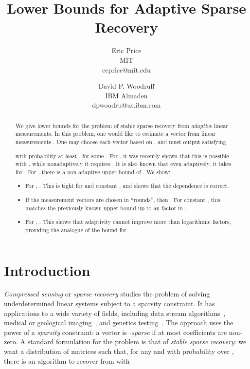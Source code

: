 \documentclass[twoside,leqno,twocolumn]{article}
\begin{document}
\title{Lower Bounds for Adaptive Sparse Recovery}

\author{Eric Price\\MIT\\ecprice@mit.edu \and David P. Woodruff\\IBM Almaden\\dpwoodru@us.ibm.com}
\date{}
\maketitle
\thispagestyle{empty}
\setcounter{page}{0}

\begin{abstract}
  We give lower bounds for the problem of stable sparse recovery from
  \emph{adaptive} linear measurements.  In this problem, one would
  like to estimate a vector  from  linear measurements
  .  One may choose each vector  based on
  , and must output  satisfying
  
  with probability at least , for some .  For
  , it was recently shown that this is possible with , while nonadaptively it requires
  .  It is also known that even
  adaptively, it takes  for . For ,
  there is a non-adaptive upper bound of
  .  We show:
  \begin{itemize}
  \item For , . This is tight for  and constant , and shows that the 
    dependence is correct.
  \item If the measurement vectors are chosen in  ``rounds'', then
    .  For constant , this matches
    the previously known upper bound up to an  factor in .
  \item For , . This shows that adaptivity
    cannot improve more than logarithmic factors, providing the analogue of the 
     bound for . 
  \end{itemize}
\end{abstract} 
\newpage

\section{Introduction}


\emph{Compressed sensing} or \emph{sparse recovery} studies the
problem of solving underdetermined linear systems subject to a
sparsity constraint.  It has applications to a wide variety of fields,
including data stream algorithms~\cite{M05}, medical or geological
imaging~\cite{CRT06,D06}, and genetics testing~\cite{SAZ}.  The
approach uses the power of a \emph{sparsity} constraint: a vector 
is \emph{-sparse} if at most  coefficients are non-zero.  A
standard formulation for the problem is that of \emph{stable sparse
  recovery}: we want a distribution  of matrices  such that, for any  and with probability
 over , there is an algorithm to recover
 from  with
\end{document}
